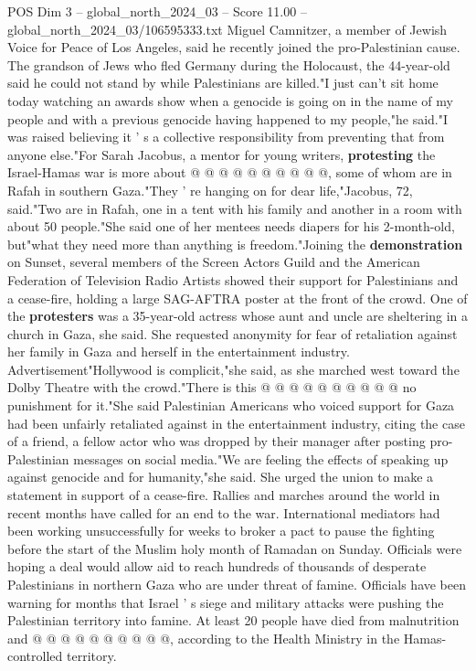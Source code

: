 \begin{textsample}{POS Dim 3 – global\_north\_2024\_03 – Score 11.00 – global\_north\_2024\_03/106595333.txt}
Miguel Camnitzer, a member of Jewish Voice for Peace of Los Angeles, said he recently joined the pro-Palestinian cause.
The grandson of Jews who fled Germany during the Holocaust, the 44-year-old said he could not stand by while Palestinians are killed."I just can't sit home today watching an awards show when a genocide is going on in the name of my people and with a previous genocide having happened to my people,"he said."I was raised believing it ' s a collective responsibility from preventing that from anyone else."For Sarah Jacobus, a mentor for young writers, \textbf{protesting} the Israel-Hamas war is more about @ @ @ @ @ @ @ @ @ @, some of whom are in Rafah in southern Gaza."They ' re hanging on for dear life,"Jacobus, 72, said."Two are in Rafah, one in a tent with his family and another in a room with about 50 people."She said one of her mentees needs diapers for his 2-month-old, but"what they need more than anything is freedom."Joining the \textbf{demonstration} on Sunset, several members of the Screen Actors Guild and the American Federation of Television Radio Artists showed their support for Palestinians and a cease-fire, holding a large SAG-AFTRA poster at the front of the crowd.
One of the \textbf{protesters} was a 35-year-old actress whose aunt and uncle are sheltering in a church in Gaza, she said.
She requested anonymity for fear of retaliation against her family in Gaza and herself in the entertainment industry.
Advertisement"Hollywood is complicit,"she said, as she marched west toward the Dolby Theatre with the crowd."There is this @ @ @ @ @ @ @ @ @ @ no punishment for it."She said Palestinian Americans who voiced support for Gaza had been unfairly retaliated against in the entertainment industry, citing the case of a friend, a fellow actor who was dropped by their manager after posting pro-Palestinian messages on social media."We are feeling the effects of speaking up against genocide and for humanity,"she said.
She urged the union to make a statement in support of a cease-fire.
Rallies and marches around the world in recent months have called for an end to the war.
International mediators had been working unsuccessfully for weeks to broker a pact to pause the fighting before the start of the Muslim holy month of Ramadan on Sunday.
Officials were hoping a deal would allow aid to reach hundreds of thousands of desperate Palestinians in northern Gaza who are under threat of famine.
Officials have been warning for months that Israel ' s siege and military attacks were pushing the Palestinian territory into famine.
At least 20 people have died from malnutrition and @ @ @ @ @ @ @ @ @ @, according to the Health Ministry in the Hamas-controlled territory.

\end{textsample}
